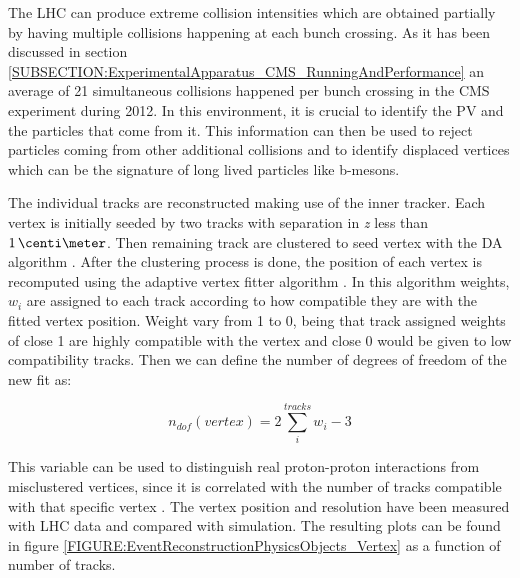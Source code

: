 
The \gls{LHC} can produce extreme collision intensities which are obtained partially by having multiple collisions happening at each bunch crossing. As it has been discussed in section \ref{SUBSECTION:ExperimentalApparatus_CMS_RunningAndPerformance} an average of 21 simultaneous collisions happened per bunch crossing in the \gls{CMS} experiment during 2012. In this environment, it is crucial to identify the \gls{PV} and the particles that come from it. This information can then be used to reject particles coming from other additional collisions and to identify displaced vertices which can be the signature of long lived particles like b-mesons.

The individual tracks are reconstructed making use of the inner tracker. Each vertex is initially seeded by two tracks with separation in \textit{z} less than $1\,\centi\meter$. Then remaining track are clustered to seed vertex with the \gls{DA} algorithm \cite{ARTICLE:DeterministicAnnealing}. After the clustering process is done, the position of each vertex is recomputed using the adaptive vertex fitter algorithm \cite{ARTICLE:AdaptiveVertexFitting}. In this algorithm weights, $w_{i}$ are assigned to each track according to how compatible they are with the fitted vertex position. Weight vary from 1 to 0, being that track assigned weights of close 1 are highly compatible with the vertex and close 0 would be given to low compatibility tracks. Then we can define the number of degrees of freedom of the new fit as:

\begin{equation}
n_{dof}(vertex)=2\sum\limits_{i}^{tracks} w_i - 3
\end{equation}

This variable can be used to distinguish real proton-proton interactions from misclustered vertices, since it is correlated with the number of tracks compatible with that specific vertex \cite{ARTICLE:CMSTrackingAndPrimaryVertex}. The vertex position and resolution have been measured with \gls{LHC} data and compared with simulation. The resulting plots can be found in figure \ref{FIGURE:EventReconstructionPhysicsObjects_Vertex} as a function of number of tracks.

